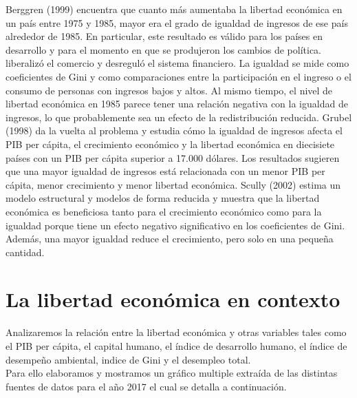     Berggren (1999) encuentra que cuanto más aumentaba la libertad económica en un país entre 1975 y 1985, mayor era el grado de igualdad de ingresos de ese país alrededor de 1985. En particular, este resultado es válido para los países en desarrollo y para el momento en que se produjeron los cambios de política. liberalizó el comercio y desreguló el sistema financiero. La igualdad se mide como coeficientes de Gini y como comparaciones entre la participación en el ingreso o el consumo de personas con ingresos bajos y altos. Al mismo tiempo, el nivel de libertad económica en 1985 parece tener una relación negativa con la igualdad de ingresos, lo que probablemente sea un efecto de la redistribución reducida. Grubel (1998) da la vuelta al problema y estudia cómo la igualdad de ingresos afecta el PIB per cápita, el crecimiento económico y la libertad económica en diecisiete países con un PIB per cápita superior a 17.000 dólares. Los resultados sugieren que una mayor igualdad de ingresos está relacionada con un menor PIB per cápita, menor crecimiento y menor libertad económica. Scully (2002) estima un modelo estructural y modelos de forma reducida y muestra que la libertad económica es beneficiosa tanto para el crecimiento económico como para la igualdad porque tiene un efecto negativo significativo en los coeficientes de Gini. Además, una mayor igualdad reduce el crecimiento, pero solo en una pequeña cantidad.

    \section*{La libertad económica en contexto}
    Analizaremos la relación entre la libertad económica y otras variables tales como el PIB per cápita, el capital humano, el índice de desarrollo humano, el índice de desempeño ambiental, indice de Gini y el desempleo total.\\
    Para ello elaboramos y mostramos un gráfico multiple extraída de las distintas fuentes de datos para el año 2017 el cual se detalla a continuación. 


